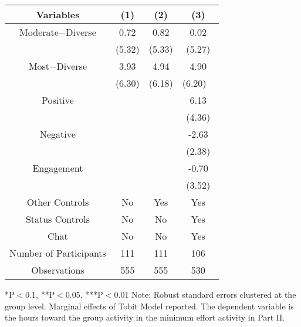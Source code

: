 \begin{table}[htbp]
    \begin{tabular}{c c c c}
    \toprule
    \textbf{Variables} & \textbf{(1)} & \textbf{(2)} & \textbf{(3)}    \\ 
\midrule
Moderate$-$Diverse  &  0.72         &  0.82            &  0.02     \\
                    &  (5.32)       &  (5.33)           &  (5.27)    \\
\addlinespace
Most$-$Diverse      &  3.93       &   4.94                &  4.90     \\
                    &  (6.30)      & (6.18)             &  (6.20)     \ \\

\addlinespace
Positive                 &           &                     &  6.13     \\
                         &           &                     &  (4.36)   \\
\addlinespace
Negative                 &           &                      &  -2.63  \\
                          &          &                      &  (2.38)    \\
\addlinespace
Engagement               &          &                        & -0.70    \\
                         &          &                          &  (3.52)   \\

\midrule
Other Controls   &   No &  Yes &    Yes    \\
Status Controls &   No  &    No    &    Yes    \\
Chat          &    No    &    No   &    Yes          \\
\midrule
Number of Participants & 111   &    111 &    106    \\
\midrule
Observations          &   555   &  555  &  530         \\
\bottomrule

\end{tabular}

\begin{footnotesize}
\newline
*P$<$0.1, **P$<$0.05, ***P$<$0.01
\newline
Note: Robust standard errors clustered at the group level. Marginal effects of Tobit Model reported. 
\newline
The dependent variable is the hours toward the group activity in the minimum effort activity in Part II. \end{footnotesize}
\end{table}
